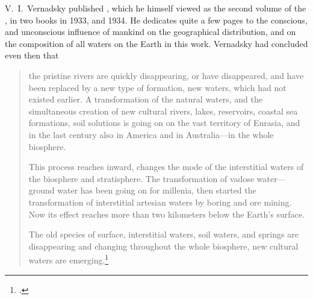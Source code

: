 V.~I.\ Vernadsky published , which he himself viewed as
the second volume of the , in two books in
1933, and 1934.  He dedicates quite a few pages to the conscious, and unconscious influence
of mankind on the geographical distribution, and on the composition of all
waters on the Earth in this work.  Vernadsky had concluded even then that
\begin{quote}
  the pristine rivers are quickly disappearing, or have disappeared, and have
  been replaced by a new type of formation, new waters, which had not existed
  earlier.  A transformation of the natural waters, and the simultaneous
  creation of new cultural rivers, lakes, reservoirs, coastal sea formations,
  soil solutions is going on on the vast territory of Eurasia, and in the last
  century also in America and in Australia---in the whole biosphere.
  
  This process reaches inward, changes the mode of the interstitial
  waters of the biosphere and stratisphere.
  The transformation of vadose water---ground
  water has been going on for millenia,
  then started the transformation of interstitial artesian
  waters by boring and ore mining.  Now its
  effect reaches more than two kilometers below the Earth's surface.
  
  The old species of surface, interstitial waters, soil waters, and
  springs are disappearing and changing throughout the whole biosphere, new
  cultural waters are emerging.\footcite{vernadsky1960sochineniya-istoriya}
\end{quote}

